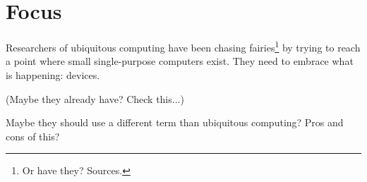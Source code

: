 \section{Focus}

Researchers of ubiquitous computing have been chasing fairies\footnote{Or have they? Sources.} by trying to reach
a point where small single-purpose computers exist. They need to embrace what is happening: devices.

(Maybe they already have? Check this...)

Maybe they should use a different term than ubiquitous computing? Pros and cons of this?